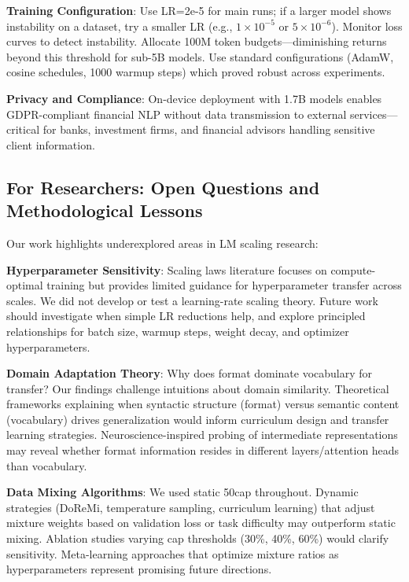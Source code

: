 \textbf{Training Configuration}: Use LR=2e-5 for main runs; if a larger model shows instability on a dataset, try a smaller LR (e.g., $1\times10^{-5}$ or $5\times10^{-6}$). Monitor loss curves to detect instability. Allocate 100M token budgets—diminishing returns beyond this threshold for sub-5B models. Use standard configurations (AdamW, cosine schedules, 1000 warmup steps) which proved robust across experiments.

\textbf{Privacy and Compliance}: On-device deployment with 1.7B models enables GDPR-compliant financial NLP without data transmission to external services—critical for banks, investment firms, and financial advisors handling sensitive client information.

\subsection{For Researchers: Open Questions and Methodological Lessons}

Our work highlights underexplored areas in LM scaling research:

\textbf{Hyperparameter Sensitivity}: Scaling laws literature \parencite{kaplan2020scaling, hoffmann2022training} focuses on compute-optimal training but provides limited guidance for hyperparameter transfer across scales. We did not develop or test a learning-rate scaling theory. Future work should investigate when simple LR reductions help, and explore principled relationships for batch size, warmup steps, weight decay, and optimizer hyperparameters.

\textbf{Domain Adaptation Theory}: Why does format dominate vocabulary for transfer? Our findings challenge intuitions about domain similarity. Theoretical frameworks explaining when syntactic structure (format) versus semantic content (vocabulary) drives generalization would inform curriculum design and transfer learning strategies. Neuroscience-inspired probing of intermediate representations may reveal whether format information resides in different layers/attention heads than vocabulary.

\textbf{Data Mixing Algorithms}: We used static 50cap throughout. Dynamic strategies (DoReMi, temperature sampling, curriculum learning) that adjust mixture weights based on validation loss or task difficulty may outperform static mixing. Ablation studies varying cap thresholds (30\%, 40\%, 60\%) would clarify sensitivity. Meta-learning approaches that optimize mixture ratios as hyperparameters represent promising future directions.


